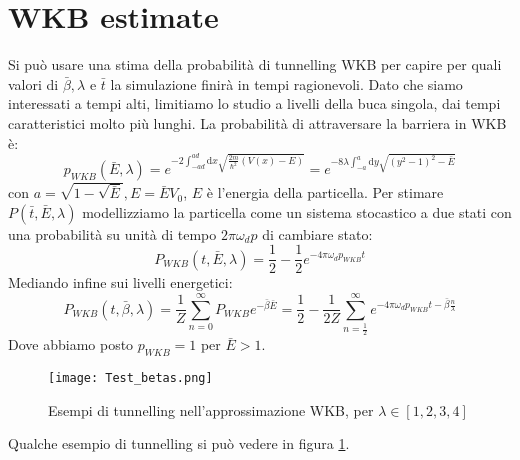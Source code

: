 \documentclass[italian]{article}
\newcommand{\dx}{\mathrm{d}x}
\newcommand{\dy}{\mathrm{d}y}
\begin{document}
	\section{WKB estimate}
	Si può usare una stima della probabilità di tunnelling WKB per capire per quali valori di $\bar{\beta}, \lambda$ e $\bar{t}$ la simulazione finirà in tempi ragionevoli.
	Dato che siamo interessati a tempi alti, limitiamo lo studio a livelli della buca singola, dai tempi caratteristici molto più lunghi.
	La probabilità di attraversare la barriera in WKB è:
	\begin{equation}
		p_{WKB}(\bar{E},\lambda)=e^{-2\int_{-ad}^{ad}\dx \sqrt{\frac{2m}{\hbar^2}(V(x)-E)}} =
		e^{-8\lambda\int_{-a}^{a} \dy \sqrt{\left(y^2 -1\right)^2 -\bar{E}}}
	\end{equation}
	con $a = \sqrt{1-\sqrt{\bar{E}}}, E = \bar{E}V_0$, $E$ è l'energia della particella. Per stimare $P(\bar{t},\bar{E}, \lambda)$ modellizziamo la particella come un sistema stocastico a due stati con una probabilità su unità di tempo $2\pi\omega_d p$ di cambiare stato:
	\begin{equation}
		P_{WKB}(t, \bar{E}, \lambda) = \frac{1}{2} - \frac{1}{2} e^{-4\pi\omega_d p_{WKB} t}
	\end{equation}
	Mediando infine sui livelli energetici:
	\begin{equation}
		P_{WKB}(t, \bar{\beta}, \lambda) = \frac{1}{Z} \sum_{n=0}^{\infty} P_{WKB} e^{-\bar{\beta}\bar{E}} =
\frac{1}{2} - \frac{1}{2Z} \sum_{n=\frac{1}{2}}^{\infty}  e^{-4\pi\omega_d p_{WKB} t-\bar{\beta}\frac{n}{\lambda}}
	\end{equation}
	Dove abbiamo posto $p_{WKB} = 1$ per $\bar{E} > 1$.
	\begin{figure}[h]
		\label{P_WKB}
		\texttt{[image: Test\_betas.png]}
		\centering
		\caption{Esempi di tunnelling nell'approssimazione WKB, per $\lambda \in [1, 2, 3, 4]$}
	\end{figure}
	Qualche esempio di tunnelling si può vedere in figura \ref{P_WKB}.
\end{document}
